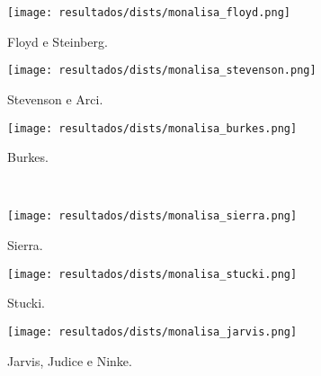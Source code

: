 \begin{subfigure}{0.33\textwidth}
    \centering
    \texttt{[image: resultados/dists/monalisa\_floyd.png]}
    \caption{Floyd e Steinberg.}
    \label{fig:monalisa:floyd}
\end{subfigure}%
\begin{subfigure}{0.33\textwidth}
    \centering
    \texttt{[image: resultados/dists/monalisa\_stevenson.png]}
    \caption{Stevenson e Arci.}
    \label{fig:monalisa:stevenson}
\end{subfigure}%
\begin{subfigure}{0.33\textwidth}
    \centering
    \texttt{[image: resultados/dists/monalisa\_burkes.png]}
    \caption{Burkes.}
    \label{fig:monalisa:burkes}
\end{subfigure}\\[8pt]
\begin{subfigure}{0.33\textwidth}
    \centering
    \texttt{[image: resultados/dists/monalisa\_sierra.png]}
    \caption{Sierra.}
    \label{fig:monalisa:sierra}
\end{subfigure}%
\begin{subfigure}{0.33\textwidth}
    \centering
    \texttt{[image: resultados/dists/monalisa\_stucki.png]}
    \caption{Stucki.}
    \label{fig:monalisa:stucki}
\end{subfigure}%
\begin{subfigure}{0.33\textwidth}
    \centering
    \texttt{[image: resultados/dists/monalisa\_jarvis.png]}
    \caption{Jarvis, Judice e Ninke.}
    \label{fig:monalisa:jarvis}
\end{subfigure}